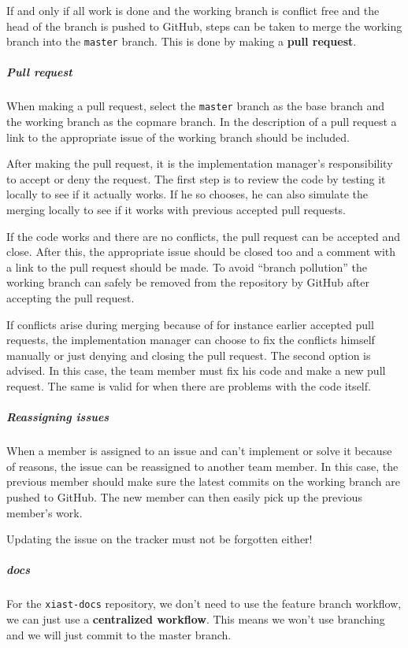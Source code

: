 \documentclass[9pt]{article}
\begin{document}
If and only if all work is done and the working branch is conflict free
and the head of the branch is pushed to GitHub, steps can be taken to
merge the working branch into the \texttt{master} branch. This is done
by making a \textbf{pull request}.

\subparagraph{Pull request}\label{pull-request}

When making a pull request, select the \texttt{master} branch as the
base branch and the working branch as the copmare branch. In the
description of a pull request a link to the appropriate issue of the
working branch should be included.

After making the pull request, it is the implementation manager's
responsibility to accept or deny the request. The first step is to
review the code by testing it locally to see if it actually works. If he
so chooses, he can also simulate the merging locally to see if it works
with previous accepted pull requests.

If the code works and there are no conflicts, the pull request can be
accepted and close. After this, the appropriate issue should be closed
too and a comment with a link to the pull request should be made. To
avoid ``branch pollution'' the working branch can safely be removed from
the repository by GitHub after accepting the pull request.

If conflicts arise during merging because of for instance earlier
accepted pull requests, the implementation manager can choose to fix the
conflicts himself manually or just denying and closing the pull request.
The second option is advised. In this case, the team member must fix his
code and make a new pull request. The same is valid for when there are
problems with the code itself.

\subparagraph{Reassigning issues}\label{reassigning-issues}

When a member is assigned to an issue and can't implement or solve it
because of reasons, the issue can be reassigned to another team member.
In this case, the previous member should make sure the latest commits on
the working branch are pushed to GitHub. The new member can then easily
pick up the previous member's work.

Updating the issue on the tracker must not be forgotten either!

\subparagraph{docs}\label{docs}

For the \texttt{xiast-docs} repository, we don't need to use the feature
branch workflow, we can just use a \textbf{centralized workflow}. This
means we won't use branching and we will just commit to the master
branch.
\end{document}
